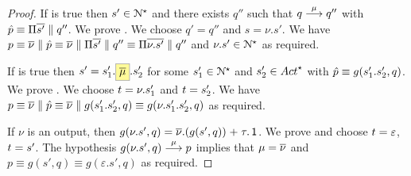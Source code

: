 \begin{proof}
If  is true then
$s' \in \mathcal{N}^\star$ and there exists $q''$ such that $q \mathrel{\overset{\mu}\longrightarrow}
q''$ with $\hat{p} \equiv \Pi \overline{s'} \mathrel{\parallel} q''$.
We prove . We choose $q' = q''$ and $s = \nu.s'$.
We have $p \equiv \overline{\nu} \mathrel{\parallel} \hat{p} \equiv \overline{\nu} \mathrel{\parallel} \Pi
\overline{s'} \mathrel{\parallel} q'' \equiv \Pi \overline{\nu.s'} \mathrel{\parallel} q''$ and $\nu.s' \in
\mathcal{N}^\star$ as required.

If  is true then
$s' = s'_1. \out{\mu}. s'_2$ for some $s'_1 \in \mathcal{N}^{\star}$ and $s'_2 \in \Actfin$
with $\hat{p} \equiv g(s'_1.s'_2, q)$.
We prove .
We choose $t = \nu.s'_1$ and $t = s'_2$.
We have $p \equiv \overline{\nu} \mathrel{\parallel} \hat{p} \equiv \overline{\nu} \mathrel{\parallel}
g(s'_1.s'_2, q) \equiv g(\nu.s'_1.s'_2, q)$ as required.


If $\nu$ is an output, then $g (\nu.s', q) = \overline{\nu}.(g (s', q)) \mathrel{+} \tau.\mathop{\textsf{1}}$.
We prove  and choose $t = \varepsilon$, $t = s'$.
The hypothesis $g (\nu.s', q) \mathrel{\overset{\mu}\longrightarrow} p$ implies that $\mu = \overline{\nu}$ and
$p \equiv g (s', q) \equiv g (\varepsilon.s', q)$ as required.
\end{proof}


